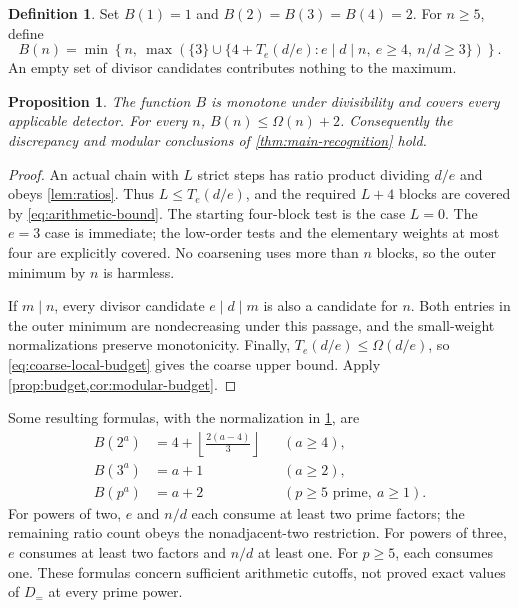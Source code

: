 \documentclass[11pt,a4paper]{amsart}
\numberwithin{equation}{section}
\theoremstyle{plain}
\newtheorem{proposition}[theorem]{Proposition}
\theoremstyle{definition}
\newtheorem{definition}[theorem]{Definition}
\begin{document}
\begin{definition}\label{def:arithmetic-bound}
Set \(B(1)=1\) and \(B(2)=B(3)=B(4)=2\).
For \(n\ge5\), define
\begin{equation}\label{eq:arithmetic-bound}
B(n)=\min\left\{n,\
\max\left(\{3\}\cup
\{4+T_e(d/e):e\mid d\mid n,\ e\ge4,\ n/d\ge3\}\right)\right\}.
\end{equation}
An empty set of divisor candidates contributes nothing to the maximum.
\end{definition}

\begin{proposition}\label{prop:refined-budget}
The function \(B\) is monotone under divisibility and covers every
applicable detector.  For every \(n\),
\(B(n)\le\Omega(n)+2\).
Consequently the discrepancy and modular conclusions of
\cref{thm:main-recognition} hold.
\end{proposition}
\begin{proof}
An actual chain with \(L\) strict steps has ratio product dividing \(d/e\)
and obeys \cref{lem:ratios}.  Thus \(L\le T_e(d/e)\), and the required
\(L+4\) blocks are covered by \eqref{eq:arithmetic-bound}.
The starting four-block test is the case \(L=0\).  The \(e=3\) case is
immediate; the low-order tests and the elementary weights at most four
are explicitly covered.  No coarsening uses more than \(n\) blocks, so the
outer minimum by \(n\) is harmless.

If \(m\mid n\), every divisor candidate \(e\mid d\mid m\) is also a candidate
for \(n\).  Both entries in the outer minimum are nondecreasing under
this passage, and the small-weight normalizations preserve monotonicity.
Finally, \(T_e(d/e)\le\Omega(d/e)\), so
\eqref{eq:coarse-local-budget} gives the coarse upper bound.
Apply \cref{prop:budget,cor:modular-budget}.
\end{proof}

Some resulting formulas, with the normalization in
\cref{def:arithmetic-bound}, are
\begin{align*}
B(2^a)&=4+\left\lfloor\frac{2(a-4)}3\right\rfloor
&& (a\ge4),\\
B(3^a)&=a+1&&(a\ge2),\\
B(p^a)&=a+2&&(p\ge5\text{ prime},\ a\ge1).
\end{align*}
For powers of two, \(e\) and \(n/d\) each consume at least two prime
factors; the remaining ratio count obeys the nonadjacent-two restriction.
For powers of three, \(e\) consumes at least two factors and \(n/d\)
at least one.  For \(p\ge5\), each
consumes one.  These formulas concern sufficient arithmetic cutoffs,
not proved exact values of \(D_{=}\) at every prime power.
\end{document}
